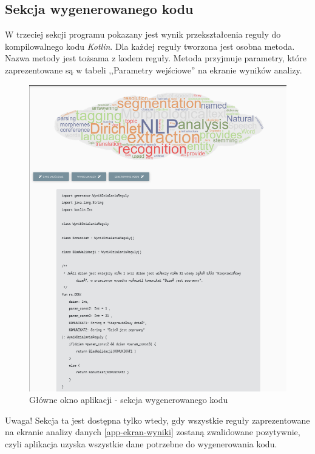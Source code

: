 \subsection{Sekcja wygenerowanego kodu}
W trzeciej sekcji programu pokazany jest wynik przekształcenia reguły do kompilowalnego kodu \textit{Kotlin}. Dla każdej reguły tworzona jest osobna metoda. Nazwa metody jest tożsama z kodem reguły. Metoda przyjmuje parametry, które zaprezentowane są w tabeli ,,Parametry wejściowe'' na ekranie wyników analizy. 
\begin{figure}[H]
	\centering
	\includegraphics[scale=0.7]{img/app/app-kod.png}
	\caption{Główne okno aplikacji - sekcja wygenerowanego kodu}\label{app-ekran-kod}
\end{figure}

Uwaga! Sekcja ta jest dostępna tylko wtedy, gdy wszystkie reguły zaprezentowane na ekranie analizy danych \ref{app-ekran-wyniki} zostaną zwalidowane pozytywnie, czyli aplikacja uzyska wszystkie dane potrzebne do wygenerowania kodu.